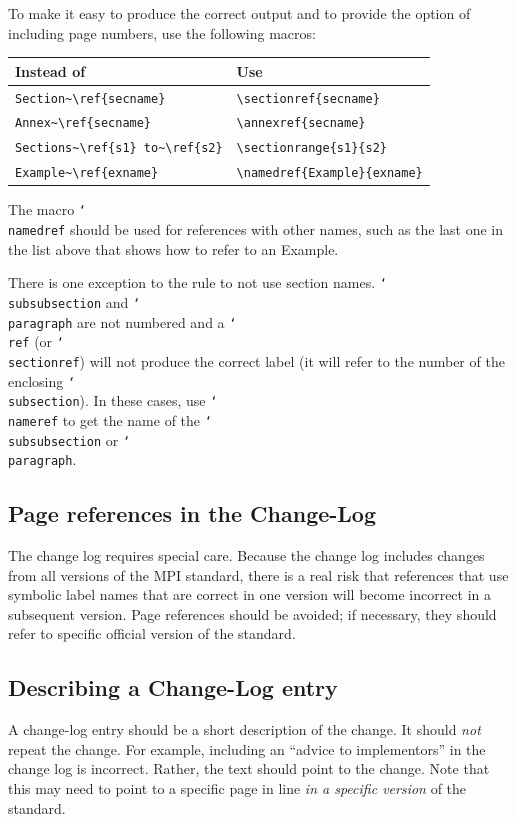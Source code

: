 \documentclass[letterpaper,twoside,11pt,fleqn]{article}
\def\cmd#1{\texttt{\char`\\#1}}
\def\MPI/{\textsf{MPI}}    %
\begin{document}
To make it easy to produce the correct output and to provide the
option of including page numbers, use the following macros:

\begin{center}
\begin{tabular}{|l|l|}\hline
\textbf{Instead of}&\textbf{Use}\\\hline
\verb+Section~\ref{secname}+&\verb+\sectionref{secname}+\\
\verb+Annex~\ref{secname}+&\verb+\annexref{secname}+\\
\verb+Sections~\ref{s1} to~\ref{s2}+&\verb+\sectionrange{s1}{s2}+\\
\verb+Example~\ref{exname}+&\verb+\namedref{Example}{exname}+\\\hline
\end{tabular}
\end{center}
The macro \cmd{namedref} should be used for references with other
names, such as the last one in the list above that shows how to refer
to an Example.

There is one exception to the rule to not use section
names. \cmd{subsubsection} and \cmd{paragraph} are not numbered and a
\cmd{ref} (or \cmd{sectionref}) will not produce the correct label (it
will refer to the number of the enclosing \cmd{subsection}).
In these cases, use \cmd{nameref} to get the name of the
\cmd{subsubsection} or \cmd{paragraph}.


\subsection{Page references in the Change-Log}
\label{sec:change-log-pages}
The change log requires special care.
Because the change log includes
changes from all versions of the \MPI/ standard, there is a real risk
that references that use symbolic label names that are correct in one
version will become incorrect in a subsequent version.
Page references should be avoided; if necessary, they should refer to
specific official version of the standard.

\subsection{Describing a Change-Log entry}
\label{sec:change-log-entries}
A change-log entry should be a short description of the change. It
should \emph{not} repeat the change.  For example, including an
``advice to implementors'' in the change log is incorrect.  Rather,
the text should point to the change. Note that this may need to point
to a specific page in line \emph{in a specific version} of the
standard.
\end{document}
